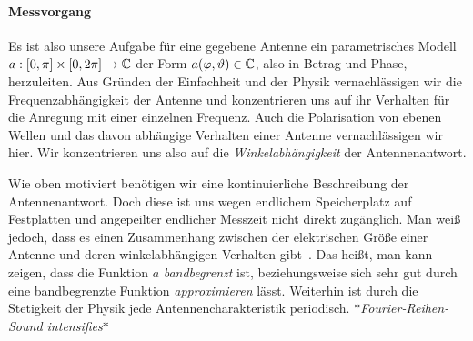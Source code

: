 \paragraph{Messvorgang}
%
%
Es ist also unsere Aufgabe f\"ur eine gegebene Antenne ein parametrisches Modell $a: [0, \pi] \times [0, 2\pi] \rightarrow \mathbb{C}$ der Form $a(\varphi, \vartheta) \in \mathbb{C}$, also in Betrag und Phase, herzuleiten. Aus Gr\"unden der Einfachheit und der Physik vernachl\"assigen wir die Frequenzabh\"angigkeit der Antenne und konzentrieren uns auf ihr Verhalten f\"ur die Anregung mit einer einzelnen Frequenz. Auch die Polarisation von ebenen Wellen und das davon abh\"angige Verhalten einer Antenne vernachl\"assigen wir hier. Wir konzentrieren uns also auf die \emph{Winkelabh\"angigkeit} der Antennenantwort.

Wie oben motiviert ben\"otigen wir eine kontinuierliche Beschreibung der Antennenantwort. Doch diese ist uns wegen endlichem Speicherplatz auf Festplatten und angepeilter endlicher Messzeit nicht direkt zug\"anglich. Man wei{\ss} jedoch, dass es einen Zusammenhang zwischen der elektrischen Gr\"o{\ss}e einer Antenne und deren winkelabh\"angigen Verhalten gibt~\cite[Kapitel~4]{delgaldo2007phd}. Das hei{\ss}t, man kann zeigen, dass die Funktion $a$ \emph{bandbegrenzt} ist, beziehungsweise sich sehr gut durch eine bandbegrenzte Funktion \emph{approximieren} l\"asst. Weiterhin ist durch die Stetigkeit der Physik jede Antennencharakteristik periodisch. \emph{$\ast$Fourier-Reihen-Sound intensifies$\ast$}

